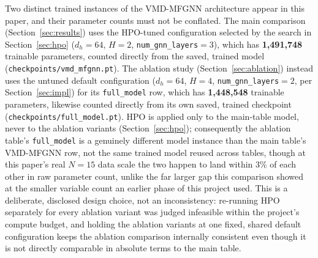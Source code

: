 \documentclass[journal]{IEEEtran}
\begin{document}
Two distinct trained instances of the VMD-MFGNN architecture appear in this paper, and their parameter counts must not be conflated. The main comparison (Section~\ref{sec:results}) uses the HPO-tuned configuration selected by the search in Section~\ref{sec:hpo} ($d_h=64$, $H=2$, \texttt{num\_gnn\_layers}$=3$), which has \textbf{1{,}491{,}748} trainable parameters, counted directly from the saved, trained model (\texttt{checkpoints/vmd\_mfgnn.pt}). The ablation study (Section~\ref{sec:ablation}) instead uses the untuned default configuration ($d_h=64$, $H=4$, \texttt{num\_gnn\_layers}$=2$, per Section~\ref{sec:impl}) for its \texttt{full\_model} row, which has \textbf{1{,}448{,}548} trainable parameters, likewise counted directly from its own saved, trained checkpoint (\texttt{checkpoints/full\_model.pt}). HPO is applied only to the main-table model, never to the ablation variants (Section~\ref{sec:hpo}); consequently the ablation table's \texttt{full\_model} is a genuinely different model instance than the main table's VMD-MFGNN row, not the same trained model reused across tables, though at this paper's real $N=15$ data scale the two happen to land within 3\% of each other in raw parameter count, unlike the far larger gap this comparison showed at the smaller variable count an earlier phase of this project used. This is a deliberate, disclosed design choice, not an inconsistency: re-running HPO separately for every ablation variant was judged infeasible within the project's compute budget, and holding the ablation variants at one fixed, shared default configuration keeps the ablation comparison internally consistent even though it is not directly comparable in absolute terms to the main table.
\end{document}
